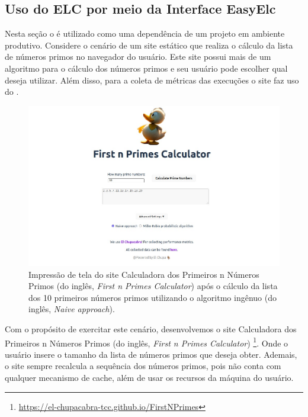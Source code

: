 \documentclass[12pt]{tcc}
\begin{document}
	\subsection{Uso do ELC por meio da Interface EasyElc}
	\label{subsection:study-case-easyelc}

	Nesta seção o  é utilizado como uma dependência de um projeto em ambiente produtivo.
	Considere o cenário de um site estático que realiza o cálculo da lista de números primos no navegador do usuário.
	Este site possui mais de um algoritmo para o cálculo dos números primos e seu usuário pode escolher qual deseja utilizar.
	Além disso, para a coleta de métricas das execuções o site faz uso do .


	\begin{figure}[!ht]
		\centering
		\includegraphics[width=1\textwidth]{figures/print-elc-numeros-primos.jpeg}
		\caption{Impressão de tela do site Calculadora dos Primeiros n Números Primos (do inglês, \emph{First n Primes Calculator}) após o cálculo da lista dos 10 primeiros números primos utilizando o algoritmo ingênuo (do inglês, \emph{Naive approach}).}
		\label{fig:site-numeros-primos}
	\end{figure}

	Com o propósito de exercitar este cenário, desenvolvemos o site Calculadora dos Primeiros n Números Primos (do inglês, \emph{First n Primes Calculator})
	\footnote{\url{https://el-chupacabra-tcc.github.io/FirstNPrimes}}.
	Onde o usuário insere o tamanho da lista de números primos que deseja obter.
	Ademais, o site sempre recalcula a sequência dos números primos, pois não conta com qualquer mecanismo de cache, além de usar os recursos da máquina do usuário.
\end{document}

